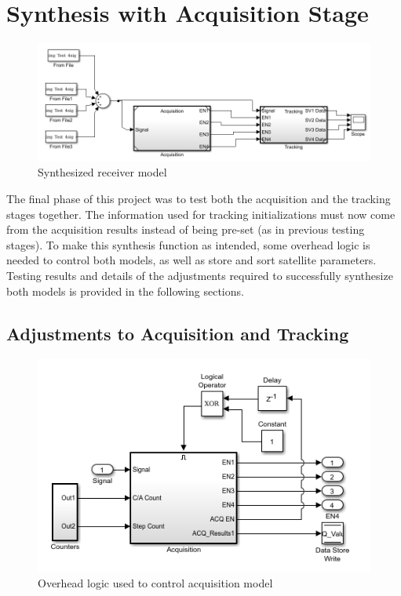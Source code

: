 \documentclass[11pt]{article}
\numberwithin{equation}{subsection}
\begin{document}
	\section{Synthesis with Acquisition Stage}
	
	\begin{figure}
		\centering
		\includegraphics[width=\textwidth]{Receiver_Model}
		\caption{Synthesized receiver model}
		\label{FRec}
	\end{figure}	
	
	The final phase of this project was to test both the acquisition and the tracking stages together. The information used for tracking initializations must now come from the acquisition results instead of being pre-set (as in previous testing stages). To make this synthesis function as intended, some overhead logic is needed to control both models, as well as store and sort satellite parameters. Testing results and details of the adjustments required to successfully synthesize both models is provided in the following sections.
	\subsection{Adjustments to Acquisition and Tracking}
	
	\begin{figure}[h]
		\centering
		\includegraphics{Acquisition_Logic}
		\caption{Overhead logic used to control acquisition model}
	\end{figure}	
	
\end{document}
